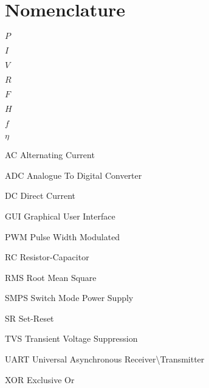 \chapter{Nomenclature}

\begin{Nomencl}
   \item[$P$]
    \item[$I$]
    \item[$V$]
    \item[$R$]
    \item[$F$]
    \item[$H$]
    \item[$f$]
    \item[$\eta$]
                      
   \item[AC]    Alternating Current
   \item[ADC]   Analogue To Digital Converter
   \item[DC]    Direct Current
   \item[GUI]   Graphical User Interface
   \item[PWM]   Pulse Width Modulated
   \item[RC]    Resistor-Capacitor
   \item[RMS]   Root Mean Square
   \item[SMPS]  Switch Mode Power Supply
   \item[SR]    Set-Reset
   \item[TVS]   Transient Voltage Suppression
   \item[UART]  Universal Asynchronous Receiver\textbackslash Transmitter
   \item[XOR]   Exclusive Or
\end{Nomencl}



\endinput
